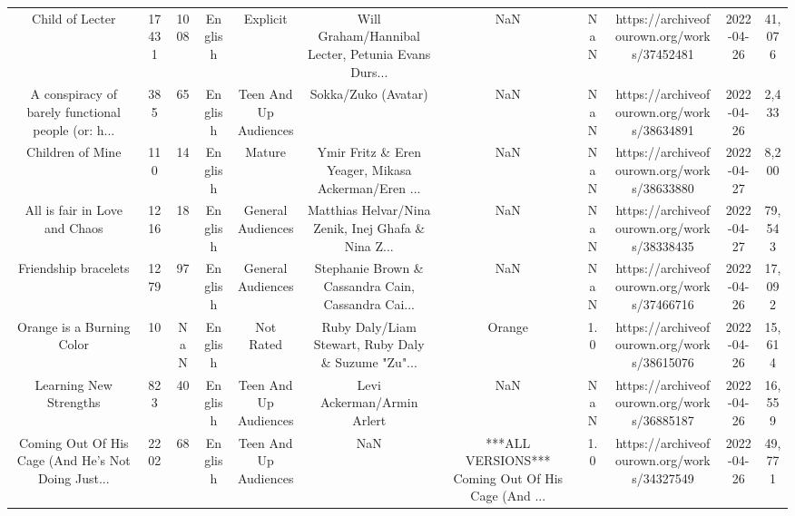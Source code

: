 \begin{table}[h!]
{\begin{tabular}{|c|c|c|c|c|c|c|c|c|c|c|}
                                   Child of Lecter &  17431 &  1008 &  English &              Explicit & Will Graham/Hannibal Lecter, Petunia Evans Durs... &                                                NaN &   NaN & https://archiveofourown.org/works/37452481 & 2022-04-26 &    41,076 \\
A conspiracy of barely functional people (or: h... &    385 &    65 &  English & Teen And Up Audiences &                                Sokka/Zuko (Avatar) &                                                NaN &   NaN & https://archiveofourown.org/works/38634891 & 2022-04-26 &     2,433 \\
                                  Children of Mine &    110 &    14 &  English &                Mature & Ymir Fritz \& Eren Yeager, Mikasa Ackerman/Eren ... &                                                NaN &   NaN & https://archiveofourown.org/works/38633880 & 2022-04-27 &     8,200 \\
                     All is fair in Love and Chaos &   1216 &    18 &  English &     General Audiences & Matthias Helvar/Nina Zenik, Inej Ghafa \& Nina Z... &                                                NaN &   NaN & https://archiveofourown.org/works/38338435 & 2022-04-27 &    79,543 \\
                              Friendship bracelets &   1279 &    97 &  English &     General Audiences & Stephanie Brown \& Cassandra Cain, Cassandra Cai... &                                                NaN &   NaN & https://archiveofourown.org/works/37466716 & 2022-04-26 &    17,092 \\
                         Orange is a Burning Color &     10 &   NaN &  English &             Not Rated & Ruby Daly/Liam Stewart, Ruby Daly \& Suzume "Zu"... &                                             Orange &   1.0 & https://archiveofourown.org/works/38615076 & 2022-04-26 &    15,614 \\
                            Learning New Strengths &    823 &    40 &  English & Teen And Up Audiences &                         Levi Ackerman/Armin Arlert &                                                NaN &   NaN & https://archiveofourown.org/works/36885187 & 2022-04-26 &    16,559 \\
Coming Out Of His Cage (And He's Not Doing Just... &   2202 &    68 &  English & Teen And Up Audiences &                                                NaN & ***ALL VERSIONS*** Coming Out Of His Cage (And ... &   1.0 & https://archiveofourown.org/works/34327549 & 2022-04-26 &    49,771 \\

\end{tabular}}
\end{table}
